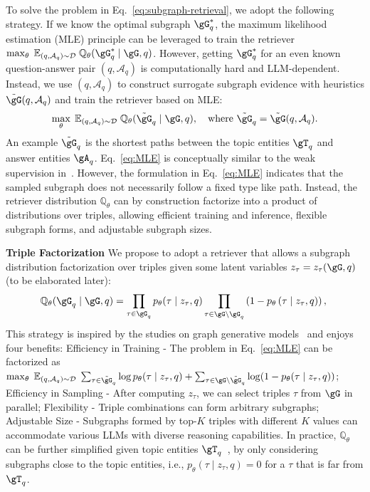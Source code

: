 To solve the problem in Eq.~\ref{eq:subgraph-retrieval}, we adopt the following strategy. If we know the optimal subgraph $\gG_q^*$, the maximum likelihood estimation (MLE) principle can be leveraged to train the retriever 
$\max_{\theta } \; \mathbb{E}_{(q, \mathcal{A}_{q})\sim \mathcal{D}}\;\mathbb{Q}_{\theta}(\gG_q^*\mid \gG, q)$. However, getting $\gG_q^*$ for an even known question-answer pair $(q,\mathcal{A}_q)$ is computationally hard and LLM-dependent. Instead, we use $(q,\mathcal{A}_q)$ to construct surrogate subgraph evidence with heuristics $\tilde{\gG}(q,\mathcal{A}_q)$ and train the retriever based on MLE:
\begin{align} \label{eq:MLE}
    \max_{\theta } \; \mathbb{E}_{(q, \mathcal{A}_{q})\sim \mathcal{D}}\;\mathbb{Q}_{\theta}(\tilde{\gG}_q\mid \gG, q), \quad \text{where $\tilde{\gG}_q=\tilde{\gG}(q,\mathcal{A}_q)$.}
\end{align}
An example $\tilde{\gG}_q$ is the shortest paths between the topic entities $\gT_q$ and answer entities $\gA_q$. Eq.~\ref{eq:MLE} is conceptually similar to the weak supervision in~\citet{zhang2022subgraph}. However, the formulation in Eq.~\ref{eq:MLE} indicates that the sampled subgraph does not necessarily follow a fixed type like path. Instead, the retriever distribution $\mathbb{Q}_{\theta}$ can by construction factorize into a product of distributions over triples, allowing efficient training and inference, flexible subgraph forms, and adjustable subgraph sizes.

\textbf{Triple Factorization} We propose to adopt a retriever that allows a subgraph distribution factorization over triples given some latent variables $z_\tau=z_{\tau}(\gG, q)$ (to be elaborated later): 
\begin{align}
\mathbb{Q}_{\theta}(\gG_q\mid \gG, q) = \prod_{\tau\in \gG_q} p_{\theta}(\tau \mid z_\tau, q)\prod_{\tau\in \gG\backslash \gG_q}\left(1-p_{\theta}\left(\tau \mid z_\tau, q\right)\right),\ 
\end{align}
This strategy is inspired by the studies on graph generative models~\citep{kipf2016variational} and enjoys four benefits: %
Efficiency 
in Training - The problem in Eq.~\ref{eq:MLE} can be factorized as $\max_{\theta } \; \mathbb{E}_{(q, \mathcal{A}_{q})\sim \mathcal{D}}\; \sum_{\tau\in \tilde{\gG}_q} \log p_{\theta}(\tau \mid z_\tau, q)+ \sum_{\tau\in \gG\backslash\tilde{\gG}_q} \log (1-p_{\theta}(\tau \mid z_\tau, q))$; 
Efficiency in Sampling - After computing $z_\tau$, we can select triples $\tau$ from
$\gG$ in parallel; Flexibility - Triple combinations can form arbitrary subgraphs;
Adjustable Size - Subgraphs formed by top-$K$ triples with different $K$ values can accommodate various LLMs with diverse reasoning capabilities. In practice, $\mathbb{Q}_{\theta}$ can be further simplified given topic entities $\gT_q$~\citep{he2021improving, jiang2023unikgqa}, by only considering subgraphs close to the topic entities, i.e., $p_{\theta}(\tau \mid z_\tau, q)=0$ for a $\tau$ that is far from $\gT_q$.

